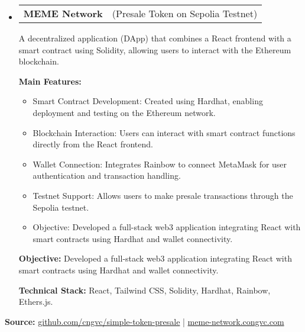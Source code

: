 \documentclass[letterpaper,11pt]{article}
\makeatletter
\newcommand{\resumeProjectTitle}[2]{
  \vspace{-2pt}\item
    \begin{tabular*}{1\textwidth}[t]{l @{\hskip 2pt} r}
      \textbf{#1} & \small #2 \\
    \end{tabular*}\vspace{2pt}
}
\newcommand{\resumeDesc}[1]{
  {#1\\ \vspace{0px}}
}
\newcommand{\resumeItem}[1]{
  \item{#1 \vspace{-2pt}}
}
\newcommand{\resumeItemListTitle}[1]{%
  \vspace{4pt} \textbf{#1} \vspace{-2pt}%
}
\newcommand{\resumeItemListStart}{\vspace{-4pt}\begin{itemize}[leftmargin=12px]}
\newcommand{\resumeItemListEnd}{\end{itemize}\vspace{-5pt}}
\newcommand{\resumeSubHeadingListStart}{\begin{itemize}[leftmargin=0pt, label={}]}
\newcommand{\resumeSubHeadingListEnd}{\end{itemize}\vspace{-5pt}}
\makeatother
\begin{document}
\resumeSubHeadingListStart
\resumeProjectTitle{MEME Network}{(Presale Token on Sepolia Testnet)}
\resumeDesc{A decentralized application (DApp) that combines a React frontend with a smart contract using Solidity, allowing users to interact with the Ethereum blockchain.}
\resumeItemListTitle{Main Features:}
\resumeItemListStart
    \resumeItem{Smart Contract Development: Created using Hardhat, enabling deployment and testing on the Ethereum network.}
    \resumeItem{Blockchain Interaction: Users can interact with smart contract functions directly from the React frontend.}
    \resumeItem{Wallet Connection: Integrates Rainbow to connect MetaMask for user authentication and transaction handling.}
    \resumeItem{Testnet Support: Allows users to make presale transactions through the Sepolia testnet.}
    \resumeItem{Objective: Developed a full-stack web3 application integrating React with smart contracts using Hardhat and wallet connectivity.}
\resumeItemListEnd
\resumeItemListTitle{Objective:} Developed a full-stack web3 application integrating React with smart contracts using Hardhat and wallet connectivity.
\par
\resumeItemListTitle{Technical Stack:} React, Tailwind CSS, Solidity, Hardhat, Rainbow, Ethers.js.
\resumeSubHeadingListEnd
\noindent\textbf{Source:} \url{github.com/cngvc/simple-token-presale} | \url{meme-network.congvc.com}

\end{document}
